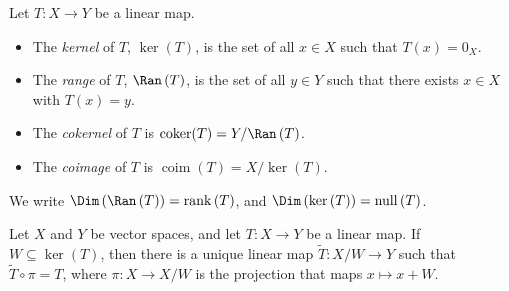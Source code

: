 \begin{definition}
  Let $T\colon X\rightarrow Y$ be a linear map.
  \begin{itemize}
    \item The \textit{kernel} of $T$, $\ker\left(T\right)$, is the set of all $x\in X$ such that $T(x) = 0_X$.
    \item The \textit{range} of $T$, $\Ran\left(T\right)$, is the set of all $y\in Y$ such that there exists $x\in X$ with $T(x) = y$.
    \item The \textit{cokernel} of $T$ is $\operatorname{coker}(T) = Y/\Ran\left(T\right)$.
    \item The \textit{coimage} of $T$ is $\operatorname{coim}\left(T\right) = X/\ker\left(T\right)$.
  \end{itemize}
  We write $\Dim\left(\Ran\left(T\right)\right) = \operatorname{rank}\left(T\right)$, and $\Dim\left(\ker\left(T\right)\right) = \operatorname{null}\left(T\right)$.
\end{definition}
\begin{theorem}
  Let $X$ and $Y$ be vector spaces, and let $T\colon X\rightarrow Y$ be a linear map. If $W\subseteq \ker\left( T \right)$, then there is a unique linear map $\widetilde{T}\colon X/W\rightarrow Y$ such that $\widetilde{T}\circ \pi = T$, where $\pi\colon X\rightarrow X/W$ is the projection that maps $x \mapsto x + W$.
\end{theorem}
%

